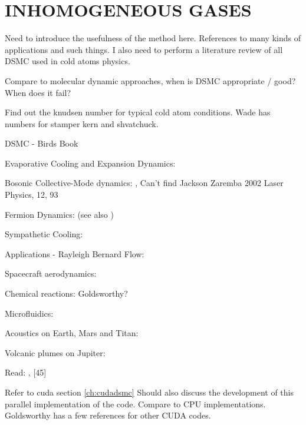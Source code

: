 
\chapter{INHOMOGENEOUS GASES} %

\label{ch:inhomogas} %


Need to introduce the usefulness of the method here. References to many kinds of applications and such things. I also need to perform a literature review of all DSMC used in cold atoms physics.

Compare to molecular dynamic approaches, when is DSMC appropriate / good? When does it fail? 

Find out the knudsen number for typical cold atom conditions. Wade has numbers for stamper kern and shvatchuck.

DSMC - Birds Book \cite{Bird1994}

Evaporative Cooling and Expansion Dynamics: \cite{Wu1996, Wu1997, Wu1998}

Bosonic Collective-Mode dynamics: \cite{Jackson2001, Jackson2001b, Jackson2002, Jackson2002b, Jackson2002c}, Can't find Jackson Zaremba 2002 Laser Physics, 12, 93

Fermion Dynamics: \cite{Urban2006, Urban2007, Urban2008, Lepers2010} (see also \cite{Vignolo2002, Toschi2003, Capuzzi2004, Toschi2004})

Sympathetic Cooling: \cite{Barletta2010, Barletta2011}

Applications - Rayleigh Bernard Flow: \cite{Watanabe1994}

Spacecraft aerodynamics: \cite{Oran1998}

Chemical reactions: \cite{Anderson2003} Goldsworthy?

Microfluidics: \cite{Frangi2003}

Acoustics on Earth, Mars and Titan: \cite{Hanford2009}

Volcanic plumes on Jupiter: \cite{Zhang2004}

Read: \sout{\cite{Minguzzi2004}}, [45]

Refer to cuda section \ref{ch:cudadsmc} Should also discuss the development of this parallel implementation of the code. Compare to CPU implementations. Goldsworthy has a few references for other CUDA codes.

